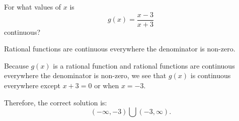 \documentclass{ximera}
\author{Emma Smith Zbarsky}
\begin{document}
\begin{exercise}

For what values of $x$ is \[g(x) = \frac{x-3}{x+3}\] continuous?


\begin{hint}
Rational functions are continuous everywhere the denominator is
non-zero.
\end{hint}


\begin{hint}
Because $g(x)$ is a rational function and rational functions are
continuous everywhere the denominator is non-zero, we see that $g(x)$ is
continuous everywhere except $x+3 = 0$ or when $x=-3$.

Therefore, the correct solution is:
\[(-\infty, -3) \bigcup (-3, \infty).\]
\end{hint}


\begin{multipleChoice}
\choice{$(-\infty, \infty)$}
\end{multipleChoice}

\end{exercise}
\end{document}
